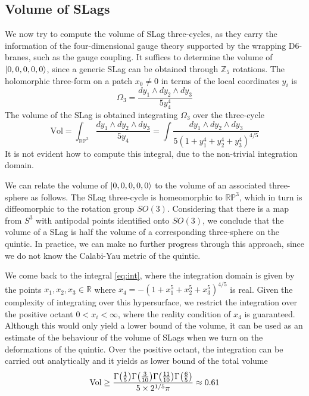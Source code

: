 \subsection{Volume of SLags}
We now try to compute the volume of SLag three-cycles, as they carry the information of the four-dimensional
gauge theory supported by the wrapping D$6$-branes, such as the gauge coupling.
It suffices to determine the volume of $\ket{0,0,0,0,0}$, since a generic SLag can be obtained through $\mathbb Z_5$ rotations.
The holomorphic three-form on a patch $x_0\neq0$ in terms of the local coordinates $y_i$ is
\begin{equation}
  \Omega_3=\frac{dy_1\wedge dy_2\wedge dy_3}{5y_4^4}
\end{equation}
The volume of the SLag is obtained integrating $\Omega_3$ over the three-cycle
\begin{equation}
  \mathrm{Vol}=\int_{\mathbb{RP}^3}\frac{dy_1\wedge dy_2\wedge dy_3}{5 y_4}=
\int \frac{dy_1\wedge dy_2\wedge dy_3}{5(1+y_1^4+y_2^4+y_3^4)^{4/5}}
\label{eq:int}
\end{equation}
It is not evident how to compute this integral, due to the non-trivial integration domain.

We can relate the volume of $\ket{0,0,0,0,0}$ to the volume of an associated three-sphere as follows.
The SLag three-cycle is homeomorphic to $\mathbb{RP}^3$, which in turn is diffeomorphic to the rotation group $SO(3)$. 
Considering that there is a map from $S^3$ with antipodal points identified onto $SO(3)$,
we conclude that the volume of a SLag is half the volume of a corresponding three-sphere on the quintic.
In practice, we can make no further progress through this approach, since we do not know
the Calabi-Yau metric of the quintic.

We come back to the integral \eqref{eq:int},
where the integration domain is given by the points $x_1,x_2,x_3 \in \mathbb R$ where $x_4=-(1+x_1^5+x_2^5+x_3^5)^{4/5}$ is real.
Given the complexity of integrating over this hypersurface, we restrict the integration over the positive octant $0<x_i<\infty$, 
where the reality condition of $x_4$ is guaranteed.
Although this would only yield a lower bound of the volume, it can be used as an estimate of
the behaviour of the volume of SLags when we turn on the deformations of the quintic.
Over the positive octant, the integration can be carried out analytically and it yields as lower
bound of the total volume
\begin{equation}
  \mathrm{Vol}\geq\frac{\Gamma\qty(\frac{1}{5})\Gamma\qty(\frac{3}{10})\Gamma\qty(\frac{11}{10})\Gamma\qty(\frac{6}{5})}{5 \times 2^{1/5}\pi}\approx 0.61
  \label{eq:vol}
\end{equation}

